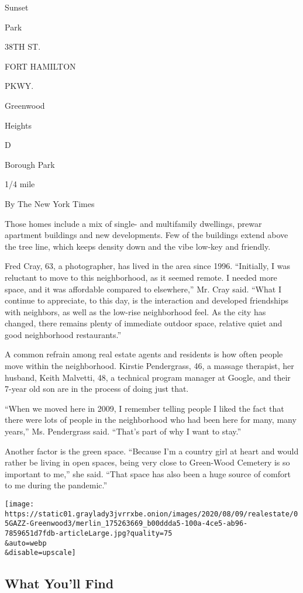 Sunset

Park

38TH ST.

FORT HAMILTON

PKWY.

Greenwood

Heights

D

Borough Park

1/4 mile

By The New York Times

Those homes include a mix of single- and multifamily dwellings, prewar
apartment buildings and new developments. Few of the buildings extend
above the tree line, which keeps density down and the vibe low-key and
friendly.

Fred Cray, 63, a photographer, has lived in the area since 1996.
``Initially, I was reluctant to move to this neighborhood, as it seemed
remote. I needed more space, and it was affordable compared to
elsewhere,'' Mr. Cray said. ``What I continue to appreciate, to this
day, is the interaction and developed friendships with neighbors, as
well as the low-rise neighborhood feel. As the city has changed, there
remains plenty of immediate outdoor space, relative quiet and good
neighborhood restaurants.''

A common refrain among real estate agents and residents is how often
people move within the neighborhood. Kirstie Pendergrass, 46, a massage
therapist, her husband, Keith Malvetti, 48, a technical program manager
at Google, and their 7-year old son are in the process of doing just
that.

``When we moved here in 2009, I remember telling people I liked the fact
that there were lots of people in the neighborhood who had been here for
many, many years,'' Ms. Pendergrass said. ``That's part of why I want to
stay.''

Another factor is the green space. ``Because I'm a country girl at heart
and would rather be living in open spaces, being very close to
Green-Wood Cemetery is so important to me,'' she said. ``That space has
also been a huge source of comfort to me during the pandemic.''

\texttt{[image: https://static01.graylady3jvrrxbe.onion/images/2020/08/09/realestate/05GAZZ-Greenwood3/merlin\_175263669\_b00ddda5-100a-4ce5-ab96-7859651d7fdb-articleLarge.jpg?quality=75\\\&auto=webp\\\&disable=upscale]}

\hypertarget{what-youll-find}{%
\subsection{What You'll Find}\label{what-youll-find}}

